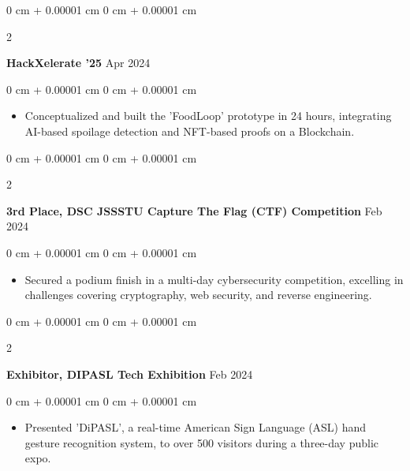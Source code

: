 \documentclass[10pt, letterpaper]{article}
\newenvironment{highlights}{
    \begin{itemize}[
        topsep=0.10 cm,
        parsep=0.10 cm,
        partopsep=0pt,
        itemsep=0pt,
        leftmargin=0 cm + 10pt
    ]
}{
    \end{itemize}
} %
\newenvironment{onecolentry}{
    \begin{adjustwidth}{
        0 cm + 0.00001 cm
    }{
        0 cm + 0.00001 cm
    }
}{
    \end{adjustwidth}
} %
\newenvironment{twocolentry}[2][]{
    \onecolentry
    \def\secondColumn{#2}
    \setcolumnwidth{\fill, 4.5 cm}
    \begin{paracol}{2}
}{
    \switchcolumn \raggedleft \secondColumn
    \end{paracol}
    \endonecolentry
} %
\begin{document}
        \vspace{0.2 cm}

        \begin{twocolentry}{
            Apr 2024
        }
            \textbf{HackXelerate '25}\end{twocolentry}

        \vspace{0.05 cm}
        \begin{onecolentry}
            \begin{highlights}
                \item Conceptualized and built the 'FoodLoop' prototype in 24 hours, integrating AI-based spoilage detection and NFT-based proofs on a Blockchain.
            \end{highlights}
        \end{onecolentry}

        \vspace{0.2 cm}

        \begin{twocolentry}{
            Feb 2024
        }
            \textbf{3rd Place, DSC JSSSTU Capture The Flag (CTF) Competition}\end{twocolentry}

        \vspace{0.05 cm}
        \begin{onecolentry}
            \begin{highlights}
                \item Secured a podium finish in a multi-day cybersecurity competition, excelling in challenges covering cryptography, web security, and reverse engineering.
            \end{highlights}
        \end{onecolentry}

        \vspace{0.2 cm}

        \begin{twocolentry}{
            Feb 2024
        }
            \textbf{Exhibitor, DIPASL Tech Exhibition}\end{twocolentry}

        \vspace{0.05 cm}
        \begin{onecolentry}
            \begin{highlights}
                \item Presented 'DiPASL', a real-time American Sign Language (ASL) hand gesture recognition system, to over 500 visitors during a three-day public expo.
            \end{highlights}
        \end{onecolentry}
\end{document}
